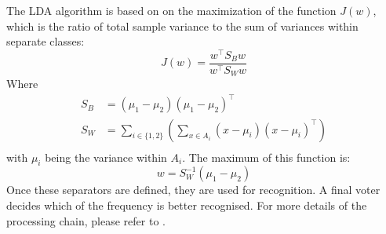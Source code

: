 \documentclass[smallextended]{svjour3}
\begin{document}
The LDA algorithm is based on on the maximization of the function $J(w)$, which is the ratio of total sample variance to the sum of variances within separate classes: 
\[
J(w) = \frac{w^\top S_Bw}{w^\top S_Ww}
\]
Where 
\begin{align*}
S_B &= (\mu_1-\mu_2)(\mu_1-\mu_2)^\top\\
S_W &= \sum_{i \in \{1, 2\}}   ( \sum_{x\in A_i} (x-\mu_i)(x-\mu_i)^\top )\\
\end{align*}
with $\mu_i$ being the variance within $A_i$. The maximum of this function is:
\[
w = S_W^{-1}(\mu_1-\mu_2)
\]
Once these separators are defined, they are used for recognition. A final voter decides which of the frequency is better recognised.
For more details of the processing chain, please refer to \cite{openvibeSSVEP}.
\end{document}
